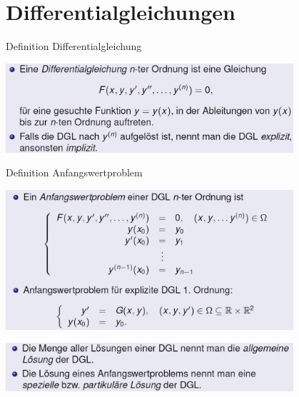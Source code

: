 \section{Differentialgleichungen}
\begin{definition}{Definition Differentialgleichung}\\
  \begin{centering}
  \includegraphics[width=0.8\textwidth]{images/2024-06-02-22-02-44.png}\\
  \end{centering}
\end{definition}
\begin{definition}{Definition Anfangswertproblem}\\
  \begin{centering}
  \includegraphics[width=0.8\textwidth]{images/2024-06-02-22-03-51.png}\\
  \end{centering}
  \begin{centering}
  \includegraphics[width=0.8\textwidth]{images/2024-06-02-22-04-20.png}\\
  \end{centering}
\end{definition}
